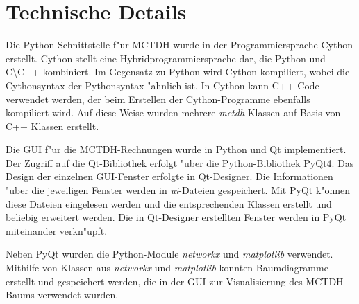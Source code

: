 \chapter{Technische Details}

Die Python-Schnittstelle f"ur MCTDH wurde in der Programmiersprache Cython erstellt. 
Cython stellt eine Hybridprogrammiersprache dar,
die Python und C\textbackslash C++ kombiniert. Im Gegensatz zu Python
wird Cython kompiliert, wobei die Cythonsyntax der Pythonsyntax "ahnlich ist.
In Cython kann C++ Code verwendet werden, der beim Erstellen der Cython-Programme ebenfalls kompiliert wird.
Auf diese Weise wurden mehrere \textit{mctdh}-Klassen auf Basis von C++ Klassen erstellt.

Die GUI f"ur die MCTDH-Rechnungen wurde in Python und Qt implementiert.
Der Zugriff auf die Qt-Bibliothek erfolgt "uber die Python-Bibliothek PyQt4. 
Das Design der einzelnen GUI-Fenster erfolgte in Qt-Designer. Die Informationen "uber 
die jeweiligen Fenster werden in \textit{ui}-Dateien gespeichert. Mit PyQt k"onnen diese Dateien eingelesen werden und die entsprechenden 
Klassen erstellt und beliebig erweitert werden.
Die in Qt-Designer erstellten Fenster werden in PyQt miteinander verkn"upft.

Neben PyQt wurden die Python-Module \textit{networkx} und \textit{matplotlib} verwendet.
Mithilfe von Klassen aus \textit{networkx} und \textit{matplotlib} konnten Baumdiagramme erstellt und gespei\-chert werden, die in der GUI zur 
Visualisierung des MCTDH-Baums verwendet wurden.

  




   
